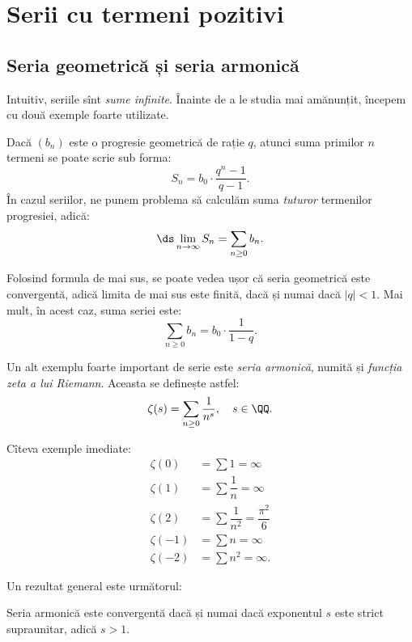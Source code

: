 \chapter{Serii cu termeni pozitivi}


\section{Seria geometrică și seria armonică}

Intuitiv, seriile sînt \emph{sume infinite}. Înainte de a le studia mai amănunțit,
începem cu două exemple foarte utilizate.

Dacă $ (b_n) $ este o progresie geometrică de rație $ q $, atunci suma primilor
$ n $ termeni se poate scrie sub forma:
\[
    S_n = b_0 \cdot \dfrac{q^n - 1}{q - 1}.
\]
În cazul seriilor, ne punem problema să calculăm suma \emph{tuturor} termenilor
progresiei, adică:
\[
    \ds\lim_{n \to \infty} S_n = \sum_{n \geq 0} b_n.
\]

Folosind formula de mai sus, se poate vedea ușor că seria geometrică
este convergentă, adică limita de mai sus este finită, dacă și numai
dacă $ |q| < 1 $. Mai mult, în acest caz, suma seriei este:
\[
    \sum_{n \geq 0} b_n = b_0 \cdot \dfrac{1}{1 - q}.
\]

\vspace{1cm}

Un alt exemplu foarte important de serie este \emph{seria armonică}, numită
și \emph{funcția zeta a lui Riemann}. Aceasta se definește astfel:
\[
    \zeta(s) = \sum_{n \geq 0} \dfrac{1}{n^s}, \quad s \in \QQ.
\]

Cîteva exemple imediate:
\begin{align*}
    \zeta(0) &= \sum 1 = \infty \\
    \zeta(1) &= \sum \dfrac{1}{n} = \infty \\
    \zeta(2) &= \sum \dfrac{1}{n^2} = \dfrac{\pi^2}{6} \\
    \zeta(-1) &= \sum n = \infty \\
    \zeta(-2) &= \sum n^2 = \infty.
\end{align*}

Un rezultat general este următorul:
\begin{theorem}\label{thm:zeta-conv}
    Seria armonică este convergentă dacă și numai dacă exponentul $ s $
    este strict supraunitar, adică $ s > 1 $.
\end{theorem}

